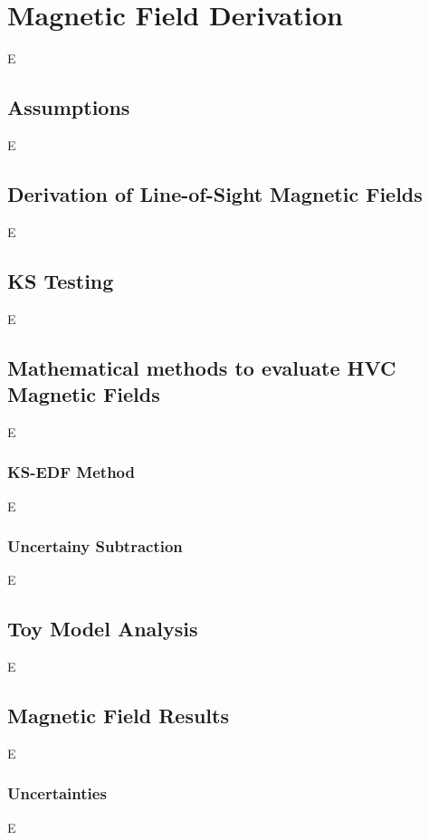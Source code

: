 \chapter{Magnetic Field Derivation}
\label{cha:derivation}

E

\section{Assumptions}
\label{sec:assumptions}

E

\section{Derivation of Line-of-Sight Magnetic Fields}
\label{sec:los_dev}

E

\section{KS Testing}
\label{sec:KStest}

E

\section{Mathematical methods to evaluate HVC Magnetic Fields}
\label{sec:evaluation}

E

\subsection{KS-EDF Method}
\label{ssec:KS_EDF}

E

\subsection{Uncertainy Subtraction}
\label{ssec:sigma_sub}

E

\section{Toy Model Analysis}
\label{sec:toy_models}

E

\section{Magnetic Field Results}
\label{sec:results}

E

\subsection{Uncertainties}
\label{ssec:results_uncertainties}

E


